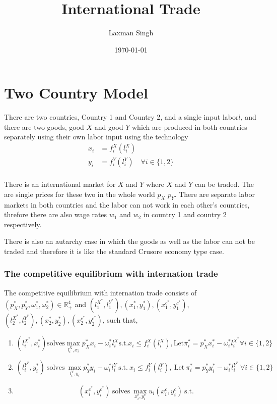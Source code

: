 \documentclass[12pt,a4paper]{article}
\author{Laxman Singh}
\date{\today}
\title{International Trade}
\begin{document}
 \section*{Two Country Model}   
 There are two countries, Country 1 and Country 2, and a single input labor\(l\), and there are two goods, good \(X\) and good \(Y\) which are produced in both countries separately using their own labor input using the technology 
 \begin{align*}
    x_{i}&=f_{i}^X(l_{i}^X)\\
    y_{i}&=f_{i}^Y(l_{i}^Y) \quad \forall i \in \{1,2\} \\
\end{align*} 
 
 There is an international market for $X$ and $Y$ where \(X\) and \(Y\) can be traded. The are single prices for these two in the whole world \(p_{X}\) \(p_{Y}\). There are separate labor markets in both countries and the labor can not work in each other's countries, threfore there are also wage rates \(w_{1}\) and \(w_{2}\) in country 1 and country 2 respectively.
 
 There is also an autarchy case in which the goods as well as the labor can not be traded and therefore it is like the standard Crusore economy type case.

\subsubsection*{ The competitive equilibrium with internation trade}

 The competitive equilibrium with internation trade consists of \((p_{X}^*,p_{Y}^*,\omega_{1}^*,\omega_{2}^*) \in \mathbb{R}^4_{+}\) and \(\left( l_{1}^{X^*},l_{1}^{Y^*} \right),\left( x_{1}^*,y_{1}^* \right),\left( x_{1}^{c^*},y_{1}^{c^*}\right)\), \(\left( l_{2}^{X^*},l_{2}^{Y^*} \right),\left( x_{2}^*,y_{2}^* \right),\left( x_{2}^{c^*},y_{2}^{c^*}\right)\), such that,
 \begin{enumerate}
\item 
\begin{equation*}
     (l_{i}^{X^*},x_{i}^*) \text{solves} \max_{l_{i}^X,x_{i}} p_{X}^*x_{i}-\omega_{i}^*l_{i}^X \text{s.t.} x_{i}\leq f_{i}^X(l_{i}^X), \text{Let} \pi_{i}^*=p_{X}^*x_{i}^* - \omega_{i}^*l_{i}^{X^*} \forall i \in \{1,2\}
 \end{equation*}
 \item
 \begin{equation*}
    (l_{i}^{Y^*},y_{i}^*)\ \text{solves} \ \max_{l_{i}^Y,y_{i}} p_{Y}^*y_{i}-\omega_{i}^*l_{i}^Y \ \text{s.t.} \ x_{i}\leq f_{i}^Y(l_{i}^Y), \ \text{Let} \ \pi_{i}^*=p_{Y}^*y_{i}^* - \omega_{i}^*l_{i}^{Y^*} \ \forall i \in \{1,2\}
\end{equation*}
\item
\[
(x_{i}^{c^*},y_{i}^{c^*}) \ \text{solves} \ \max_{x_{i}^c,y_{i}^c} u_{i}(x_{i}^c,y_{i}^c) \ \text{s.t.} \ 
\]
\end{enumerate}
\end{document}
